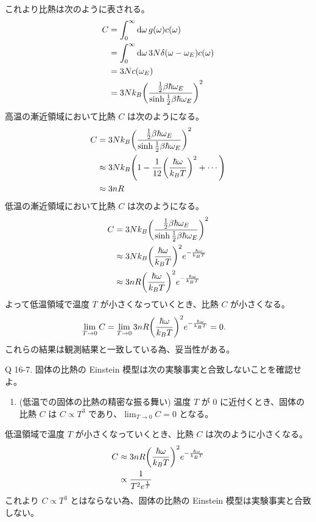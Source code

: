 \documentclass[uplatex,dvipdfmx,a4paper,11pt]{jlreq}
\theoremstyle{definition}
\begin{document}
これより比熱は次のように表される。
\begin{align}
  C & = \int_0^\infty\dd{\omega}g(\omega)c(\omega)                                            \\
    & = \int_0^\infty\dd{\omega}3N\delta(\omega - \omega_E)c(\omega)                          \\
    & = 3Nc(\omega_E)                                                                         \\
    & = 3Nk_B\qty(\frac{\frac{1}{2}\beta\hbar\omega_E}{\sinh\frac{1}{2}\beta\hbar\omega_E})^2
\end{align}
高温の漸近領域において比熱 $C$ は次のようになる。
\begin{align}
  C & = 3Nk_B\qty(\frac{\frac{1}{2}\beta\hbar\omega_E}{\sinh\frac{1}{2}\beta\hbar\omega_E})^2 \\
    & \approx 3Nk_B\qty(1 - \frac{1}{12}\qty(\frac{\hbar\omega}{k_BT})^2 + \cdots)            \\
    & \approx 3nR
\end{align}
低温の漸近領域において比熱 $C$ は次のようになる。
\begin{align}
  C & = 3Nk_B\qty(\frac{\frac{1}{2}\beta\hbar\omega_E}{\sinh\frac{1}{2}\beta\hbar\omega_E})^2 \\
    & \approx 3Nk_B\qty(\frac{\hbar\omega}{k_BT})^2e^{-\frac{\hbar\omega}{k_BT}}              \\
    & \approx 3nR\qty(\frac{\hbar\omega}{k_BT})^2e^{-\frac{\hbar\omega}{k_BT}}
\end{align}
よって低温領域で温度 $T$ が小さくなっていくとき、比熱 $C$ が小さくなる。
\begin{align}
  \lim_{T\to 0} C & = \lim_{T\to 0}3nR\qty(\frac{\hbar\omega}{k_BT})^2e^{-\frac{\hbar\omega}{k_BT}} = 0.
\end{align}
これらの結果は観測結果と一致している為、妥当性がある。

\begin{itembox}[l]{Q 16-7.}
  固体の比熱の Einstein 模型は次の実験事実と合致しないことを確認せよ。
  \begin{enumerate}
    \item (低温での固体の比熱の精密な振る舞い) 温度 $T$ が $0$ に近付くとき、固体の比熱 $C$ は $C \propto T^3$ であり、$\lim_{T\to 0} C = 0$ となる。
  \end{enumerate}
\end{itembox}
低温領域で温度 $T$ が小さくなっていくとき、比熱 $C$ は次のように小さくなる。
\begin{align}
  C & \approx 3nR\qty(\frac{\hbar\omega}{k_BT})^2e^{-\frac{\hbar\omega}{k_BT}} \\
    & \propto \frac{1}{T^{2}e^{\frac{1}{T}}}
\end{align}
これより $C \propto T^3$ とはならない為、固体の比熱の Einstein 模型は実験事実と合致しない。
\end{document}
